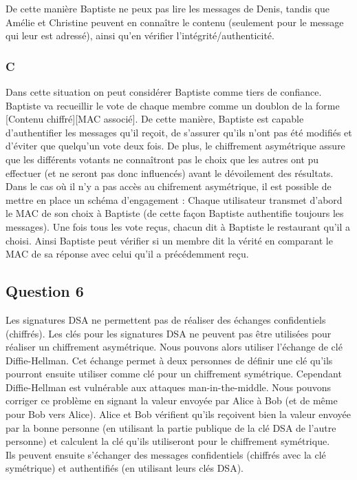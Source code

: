 \documentclass[a4paper, 11pt, oneside]{article}
\begin{document}
De cette manière Baptiste ne peux pas lire les messages de Denis, tandis que Amélie et Christine peuvent en connaître le contenu (seulement pour le message qui leur est adressé), ainsi qu'en vérifier l'intégrité/authenticité.

\subsubsection{C}

Dans cette situation on peut considérer Baptiste comme tiers de confiance. Baptiste va recueillir le vote de chaque membre comme un doublon de la forme [Contenu chiffré][MAC associé]. De cette manière, Baptiste est capable d'authentifier les messages qu'il reçoit, de s'assurer qu'ils n'ont pas été modifiés et d'éviter que quelqu'un vote deux fois. De plus, le chiffrement asymétrique assure que les différents votants ne connaîtront pas le choix que les autres ont pu effectuer (et ne seront pas donc influencés) avant le dévoilement des résultats.\\[5pt]
Dans le cas où il n'y a pas accès au chifrement asymétrique, il est possible de mettre en place un schéma d'engagement : Chaque utilisateur transmet d'abord le MAC de son choix à Baptiste (de cette façon Baptiste authentifie toujours les messages). Une fois tous les vote reçus, chacun dit à Baptiste le restaurant qu'il a choisi. Ainsi Baptiste peut vérifier si un membre dit la vérité en comparant le MAC de sa réponse avec celui qu'il a précédemment reçu.

\subsection{Question 6}

Les signatures DSA ne permettent pas de réaliser des échanges confidentiels (chiffrés). Les clés pour les signatures DSA ne peuvent pas être utilisées pour réaliser un chiffrement asymétrique.
Nous pouvons alors utiliser l'échange de clé Diffie-Hellman. Cet échange permet à deux personnes de définir une clé qu'ils pourront ensuite utiliser comme clé pour un chiffrement symétrique.
Cependant Diffie-Hellman est vulnérable aux attaques man-in-the-middle. Nous pouvons corriger ce problème en signant la valeur envoyée par Alice à Bob (et de même pour Bob vers Alice). Alice et Bob vérifient qu'ils reçoivent bien la valeur envoyée par la bonne personne (en utilisant la partie publique de la clé DSA de l'autre personne) et calculent la clé qu'ils utiliseront pour le chiffrement symétrique.
\\
Ils peuvent ensuite s'échanger des messages confidentiels (chiffrés avec la clé symétrique) et authentifiés (en utilisant leurs clés DSA).
\end{document}
